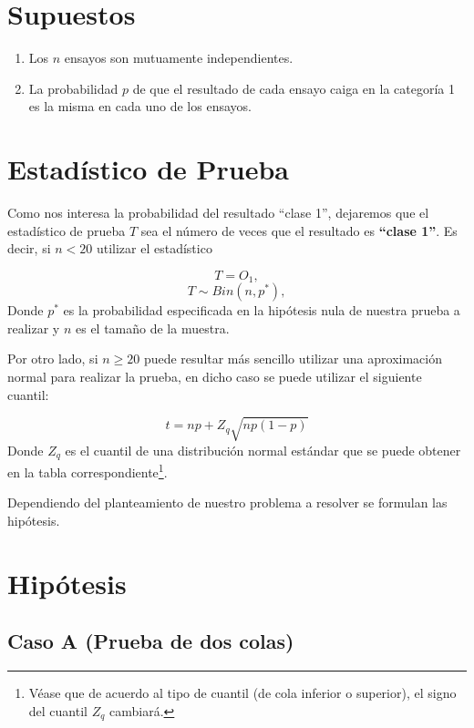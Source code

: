 \documentclass[
  a4paper,
  oneside,
  openany]{book}
\begin{document}
\hypertarget{supuestos}{%
\section{Supuestos}\label{supuestos}}

\begin{enumerate}
\def\labelenumi{\arabic{enumi})}
\item
  Los \(n\) ensayos son mutuamente independientes.
\item
  La probabilidad \(p\) de que el resultado de cada ensayo caiga en la categoría 1 es la misma en cada uno de los ensayos.
\end{enumerate}

\hypertarget{estaduxedstico-de-prueba}{%
\section{Estadístico de Prueba}\label{estaduxedstico-de-prueba}}

Como nos interesa la probabilidad del resultado ``clase 1'', dejaremos que el estadístico de prueba \(T\) sea el número de veces que el resultado es \textbf{``clase 1''}.
Es decir, si \(n<20\) utilizar el estadístico

\[T=O_{1},\]
\[ T \sim Bin (n,p^*),\]
Donde \(p^*\) es la probabilidad especificada en la hipótesis nula de nuestra prueba a realizar y \(n\) es el tamaño de la muestra.

Por otro lado, si \(n\geq20\) puede resultar más sencillo utilizar una aproximación normal para realizar la prueba, en dicho caso se puede utilizar el siguiente cuantil:

\[t=np+Z_{q}\sqrt{np(1-p)}\]
Donde \(Z_{q}\) es el cuantil de una distribución normal estándar que se puede obtener en la tabla correspondiente\footnote{Véase que de acuerdo al tipo de cuantil (de cola inferior o superior), el signo del cuantil \(Z_q\) cambiará.}.

Dependiendo del planteamiento de nuestro problema a resolver se formulan las hipótesis.

\hypertarget{hipuxf3tesis}{%
\section{Hipótesis}\label{hipuxf3tesis}}

\hypertarget{caso-a-prueba-de-dos-colas}{%
\subsection*{Caso A (Prueba de dos colas)}\label{caso-a-prueba-de-dos-colas}}
\end{document}
